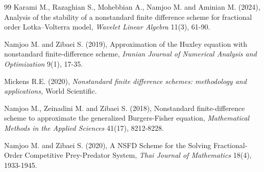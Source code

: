 \documentclass[twoside]{article}
\begin{document}
\begin{thebibliography}{99}
	Karami M., Razaghian S., Mohebbian A., Namjoo M. and Aminian M. (2024), Analysis of the stability of a nonstandard finite difference scheme for fractional order Lotka–Volterra model, {\it Wavelet Linear Algebra} 11(3), 61-90.
	
	Namjoo M. and Zibaei S. (2019), Approximation of the Huxley equation with nonstandard finite-difference scheme, {\it Iranian Journal of Numerical Analysis and Optimization} 9(1), 17-35.
	
	Mickens R.E. (2020), {\it Nonstandard finite difference schemes: methodology and applications,} World Scientific.
	
	Namjoo M., Zeinadini M. and Zibaei S. (2018), Nonstandard finite-difference scheme to approximate the generalized Burgers-Fisher equation, {\it Mathematical Methods in the Applied Sciences} 41(17), 8212-8228.
	
	Namjoo M. and Zibaei S. (2020), A NSFD Scheme for the Solving Fractional-Order Competitive Prey-Predator System, {\it Thai Journal of Mathematics} 18(4), 1933-1945.
	
\end{thebibliography}
\end{document}
